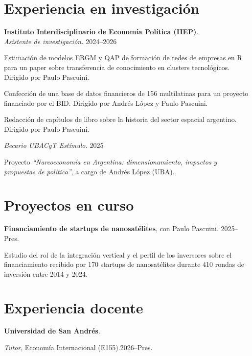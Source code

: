 \documentclass[11pt]{article}
\newcommand{\entrydate}[1]{\hfill{\small{#1}}}
\begin{document}
\section{Experiencia en investigación}
\textbf{Instituto Interdisciplinario de Economía Política (IIEP)}.
\\
\textit{Asistente de investigación.} \entrydate{2024--2026}
\begin{cvitems}
    \item Estimación de modelos ERGM y QAP de formación de redes de empresas en R para un paper sobre transferencia de conocimiento en clusters tecnológicos. Dirigido por Paulo Pascuini.
    \item Confección de una base de datos financieros de 156 multilatinas para un proyecto financiado por el BID. Dirigido por Andrés López y Paulo Pascuini.
    \item Redacción de capítulos de libro sobre la historia del sector espacial argentino. Dirigido por Paulo Pascuini.
\end{cvitems}
\vspace{5pt}
\textit{Becario UBACyT Estímulo.} \entrydate{2025}
\begin{cvitems}
    \item  Proyecto \emph{``Narcoeconomía en Argentina: dimensionamiento, impactos y propuestas de política''}, a cargo de Andrés López (UBA).
\end{cvitems}

\section{Proyectos en curso}
\textbf{Financiamiento de startups de nanosatélites}, con Paulo Pascuini. \entrydate{2025--Pres.}
\begin{cvitems}
  \item Estudio del rol de la integración vertical y el perfil de los inversores sobre el financiamiento recibido por 170 startups de nanosatélites durante 410 rondas de inversión entre 2014 y 2024.
\end{cvitems}

\section{Experiencia docente}
\textbf{Universidad de San Andrés}.
\begin{cvitems}
  \item \textit{Tutor}, Economía Internacional (E155).\entrydate{2026--Pres.}
\end{cvitems}
\end{document}
